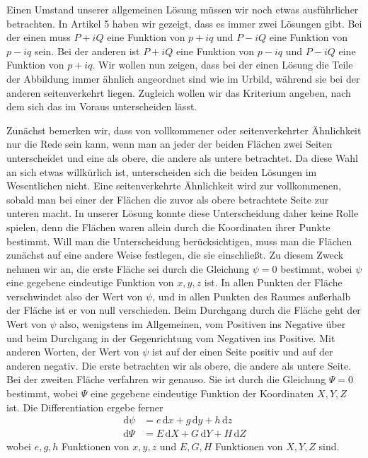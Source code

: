 Einen Umstand unserer allgemeinen Lösung müssen wir noch etwas ausführlicher betrachten. In Artikel 5 haben wir gezeigt, dass es immer zwei Lösungen gibt. Bei der einen muss \(P+iQ\) eine Funktion von \(p+iq\) und \(P-iQ\) eine Funktion von \(p-iq\) sein. Bei der anderen ist \(P+iQ\) eine Funktion von \(p-iq\) und \(P-iQ\) eine Funktion von \(p+iq\). Wir wollen nun zeigen, dass bei der einen Lösung die Teile der Abbildung immer ähnlich angeordnet sind wie im Urbild, während sie bei der anderen seitenverkehrt liegen. Zugleich wollen wir das Kriterium angeben, nach dem sich das im Voraus unterscheiden lässt.

Zunächst bemerken wir, dass von vollkommener oder seitenverkehrter Ähnlichkeit nur die Rede sein kann, wenn man an jeder der beiden Flächen zwei Seiten unterscheidet und eine als obere, die andere als untere betrachtet. Da diese Wahl an sich etwas willkürlich ist, unterscheiden sich die beiden Lösungen im Wesentlichen nicht. Eine seitenverkehrte Ähnlichkeit wird zur vollkommenen, sobald man bei einer der Flächen die zuvor als obere betrachtete Seite zur unteren macht. In unserer Lösung konnte diese Unterscheidung daher keine Rolle spielen, denn die Flächen waren allein durch die Koordinaten ihrer Punkte bestimmt. Will man die Unterscheidung berücksichtigen, muss man die Flächen zunächst auf eine andere Weise festlegen, die sie einschließt. Zu diesem Zweck nehmen wir an, die erste Fläche sei durch die Gleichung \(\psi=0\) bestimmt, wobei \(\psi\) eine gegebene eindeutige Funktion von \(x,y,z\) ist. In allen Punkten der Fläche verschwindet also der
Wert von \(\psi\), und in allen Punkten des Raumes außerhalb der Fläche ist er von null verschieden. Beim Durchgang durch die Fläche geht der Wert von \(\psi\) also, wenigstens im Allgemeinen, vom Positiven ins Negative über und beim Durchgang in der Gegenrichtung vom Negativen ins Positive. Mit anderen Worten, der Wert von \(\psi\) ist auf der einen Seite positiv und auf der anderen negativ. Die erste betrachten wir als obere, die andere als untere Seite. Bei der zweiten Fläche verfahren wir genauso. Sie ist durch die Gleichung \(\Psi=0\) bestimmt, wobei \(\Psi\) eine gegebene eindeutige Funktion der Koordinaten \(X,Y,Z\) ist. Die Differentiation ergebe ferner
\[
\begin{aligned}
\mathrm{d}\psi&=e\,\mathrm{d}x+g\,\mathrm{d}y+h\,\mathrm{d}z\\
\mathrm{d}\Psi&=E\,\mathrm{d}X+G\,\mathrm{d}Y+H\,\mathrm{d}Z
\end{aligned}
\]
\noindent wobei \(e,g,h\) Funktionen von \(x,y,z\) und \(E,G,H\) Funktionen von \(X,Y,Z\) sind.

